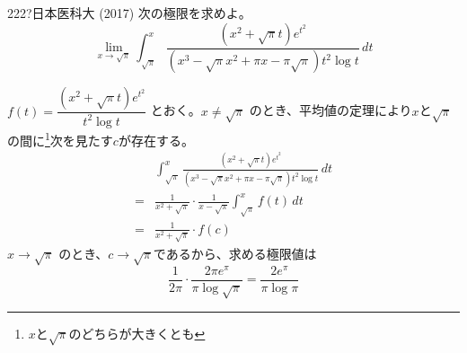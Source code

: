 \begin{thm}{222}{\hosi ?}{日本医科大 (2017)}
 次の極限を求めよ。 \\
 \[ \lim_{x\to\sqrt{\pi}} \int_{\sqrt{\pi}}^x\! \frac{(x^2+\sqrt{\pi}t)e^{t^2}}{(x^3-\sqrt{\pi}x^2+\pi x-\pi\sqrt{\pi})t^2\log t} \,dt \]
\end{thm}

$f(t)=\dfrac{(x^2+\sqrt{\pi} t)e^{t^2}}{t^2\log t}$ とおく。$x\neq\sqrt{\pi}$ のとき、平均値の定理により$x$と$\sqrt{\pi}$の間に\footnote{$x$と$\sqrt{\pi}$のどちらが大きくとも}次を見たす$c$が存在する。
\begin{align*}
 &\int_{\sqrt{\pi}}^x\! \frac{(x^2+\sqrt{\pi}t)e^{t^2}}{(x^3-\sqrt{\pi}x^2+\pi x-\pi\sqrt{\pi})t^2\log t} \,dt \\
 =& \frac{1}{x^2+\sqrt{\pi}}\cdot\frac{1}{x-\sqrt{\pi}}\int_{\sqrt{\pi}}^x\!f(t)\,dt \\
 =& \frac{1}{x^2+\sqrt{\pi}}\cdot f(c)
\end{align*}
$x\to\sqrt{\pi}$ のとき、$c\to\sqrt{\pi}$であるから、求める極限値は
\[ \frac{1}{2\pi}\cdot\frac{2\pi e^\pi}{\pi\log\sqrt{\pi}} = \frac{2e^\pi}{\pi\log\pi} \]